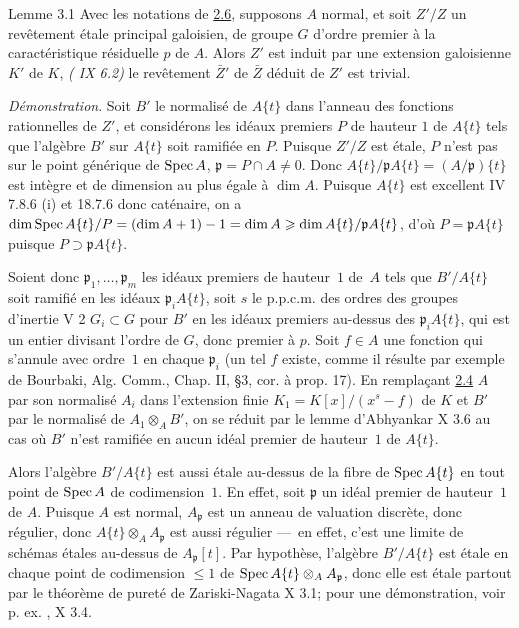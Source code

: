 \documentclass[10pt]{../fichiers-configuration-latex/smfart}
\begin{document}
\begin{enonce*}{Lemme 3.1}
Avec les notations de \hyperref[XV.lem2.6]{2.6}, supposons $A$ normal, et soit $Z'/Z$ un
revêtement étale principal galoisien, de groupe $G$ d'ordre premier à
la caractéristique résiduelle $p$ de $A$. Alors $Z'$ est induit par
une extension galoisienne $K'$ de $K$, \ie \emph{( IX 6.2)} le
revêtement $\bar{Z}'$ de $\bar{Z}$ déduit de $Z'$ est trivial.
\end{enonce*}

\noindent
\emph{Démonstration}. Soit $B'$ le normalisé de $A\{t\}$ dans l'anneau
des fonctions rationnelles de $Z'$, et considérons les idéaux premiers
$P$ de hauteur $1$ de $A\{t\}$ tels que l'algèbre $B'$ sur $A\{t\}$
soit ramifiée en $P$. Puisque $Z'/Z$ est étale, $P$ n'est pas sur le
point générique de $\operatorname{Spec} A$, \ie $\mathfrak{p}=P\cap A\neq 0$. Donc
$A\{t\}/\mathfrak{p}A\{t\}=(A/\mathfrak{p})\{t\}$ est intègre et de dimension au plus
égale à $\dim A$. Puisque $A\{t\}$ est excellent \sisi{(}{}\EGA IV 7.8.6 (i) et
18.7.6\sisi{)}{} donc caténaire, on a $\dim \operatorname{Spec} A\{t\}/P=(\dim A+1)-1=\dim
A\geqslant \dim A\{t\}/\mathfrak{p}A\{t\}$, d'où\pageoriginale
$P=\mathfrak{p}A\{t\}$ puisque $P\supset \mathfrak{p}A\{t\}$.

Soient donc $\mathfrak{p}_1,\ldots,\mathfrak{p}_m$ les idéaux premiers de hauteur~$1$
de~$A$ tels que $B'/A\{t\}$ soit ramifié en les idéaux $\mathfrak{p}_iA\{t\}$,
soit $s$ le p.p.c.m. des ordres des groupes d'inertie \sisi{(}{} V 2\sisi{)}{} $G_{i}\subset G$ pour $B'$ en les idéaux premiers au-dessus des
$\mathfrak{p}_{i}A\{t\}$, qui est un entier divisant l'ordre de $G$, donc
premier à $p$. Soit $f\in A$ une fonction qui s'annule avec ordre~$1$ en
chaque $\mathfrak{p}_i$ (un tel $f$ existe, comme il résulte par exemple de
Bourbaki, Alg. Comm., Chap. II, \S 3, cor. à prop. 17). En remplaçant
\sisi{(}{}\hyperref[XV.cor2.4]{2.4}\sisi{)}{} $A$ par son normalisé $A_i$ dans l'extension finie
$K_{1}=K[x]/(x^{s}-f)$ de $K$ et $B'$ par le normalisé de
$A_{1}\otimes_A B'$, on se réduit par le lemme d'Abhyankar
\sisi{(}{} X 3.6\sisi{)}{}
au cas où $B'$ n'est ramifiée en aucun idéal premier de hauteur~$1$ de $A\{t\}$.

Alors l'algèbre $B'/A\{t\}$ est aussi étale au-dessus de la fibre de
$\operatorname{Spec} A\{t\}$ en tout point de $\operatorname{Spec} A$ de codimension~$1$. En effet,
soit $\mathfrak{p}$ un idéal premier de hauteur~$1$ de $A$. Puisque $A$ est
normal, $A_{\mathfrak{p}}$ est un anneau de valuation discrète, donc
régulier, donc $A\{t\}\otimes_A A_{\mathfrak{p}}$ est aussi régulier
---~en effet, c'est une limite de schémas étales au-dessus de $A_{\mathfrak{p}}[t]$.
Par hypothèse, l'algèbre $B'/A\{t\}$ est étale en chaque point
de codimension $\leq 1$ de $\operatorname{Spec} A\{t\}\otimes_A A_{\mathfrak{p}}$, donc
elle est étale partout par le théorème de pureté de Zariski-Nagata
\sisi{(}{} X 3.1\sisi{)}{}; pour une démonstration, voir p. ex. , X 3.4.
\end{document}

